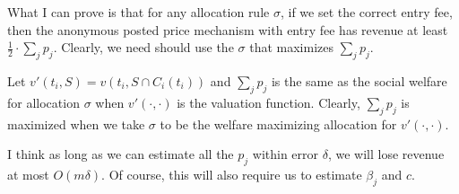 {What I can prove is that for any allocation rule $\sigma$, if we set the correct entry fee, then the anonymous posted price mechanism with entry fee has revenue at least $\frac{1}{2}\cdot \sum_j p_j$. Clearly, we need should use the $\sigma$ that maximizes $\sum_j p_j$.

Let $v'(t_i,S) = v(t_i, S\cap C_i(t_i))$ and $\sum_j p_j$ is the same as the social welfare for allocation $\sigma$ when $v'(\cdot,\cdot)$ is the valuation function. Clearly, $\sum_j p_j$ is maximized when we take $\sigma$ to be the welfare maximizing allocation for $v'(\cdot,\cdot)$.


I think as long as we can estimate all the $p_j$ within error $\delta$, we will lose revenue at most $O(m\delta)$. Of course, this will also require us to estimate $\beta_j$ and $c$. %
}
